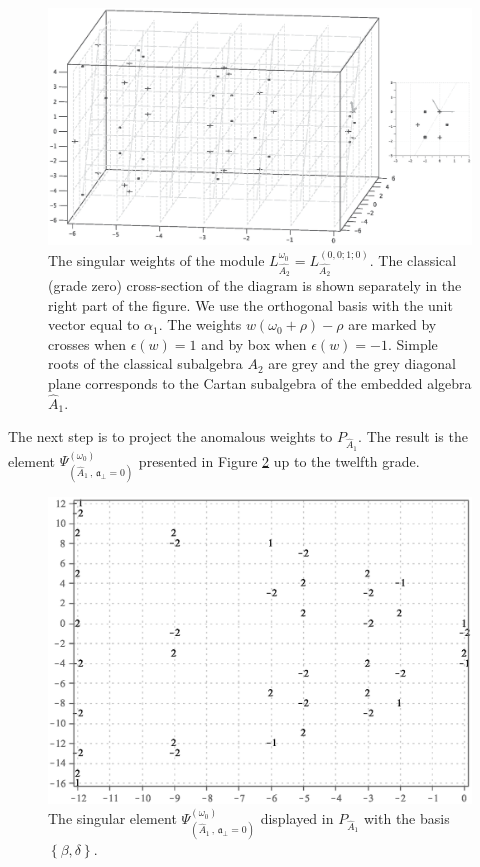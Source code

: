 \documentclass[12pt]{iopart}
\theoremstyle{definition}
\newcommand{\afb}{\mathfrak{a}_{\bot}}
\begin{document}
\begin{figure}[h!tb]
  \hspace*{-1.5cm}
  \includegraphics[width=180mm]{figure7.eps}
  \caption{The singular weights of the module $L_{\hat{A_2}}^{\omega_0}=L^{(0,0;1;0)}_{\hat{A_2}}$.
   The classical (grade zero) cross-section of the diagram is shown separately
   in the right part of the figure.
  We use the orthogonal basis with the unit vector equal to $\alpha_1$.
  The weights $w (\omega_0+\rho)-\rho$ are marked by crosses when $\epsilon(w)=1$ and
by box when $\epsilon(w)=-1$. Simple roots of the classical subalgebra $A_2$ are
grey and the grey diagonal plane corresponds to the Cartan subalgebra of
the embedded algebra $\hat{A}_1$.}
  \label{fig:affine_A2_anom_point}
\end{figure}

The next step is  to project the anomalous weights to $P_{\hat A_1}$.
The result is the element $\Psi ^{\left( \omega_0 \right) }_{\left(  \hat A_1\, , \, \afb=0 \right)}$
presented in Figure \ref{fig:AffineA2_A1_anom_proj} up to the twelfth grade.
\begin{figure}[h!tb]
  \centering
  \includegraphics[width=130mm]{figure8.eps}
  \caption{The singular element $\Psi ^{\left( \omega_0 \right) }_{\left(  \hat A_1\, , \, \afb=0 \right)}$
  displayed in $P_{\hat A_1}$
  with the basis $\left\{\beta,\delta \right\}$.}
  \label{fig:AffineA2_A1_anom_proj}
\end{figure}
\end{document}
